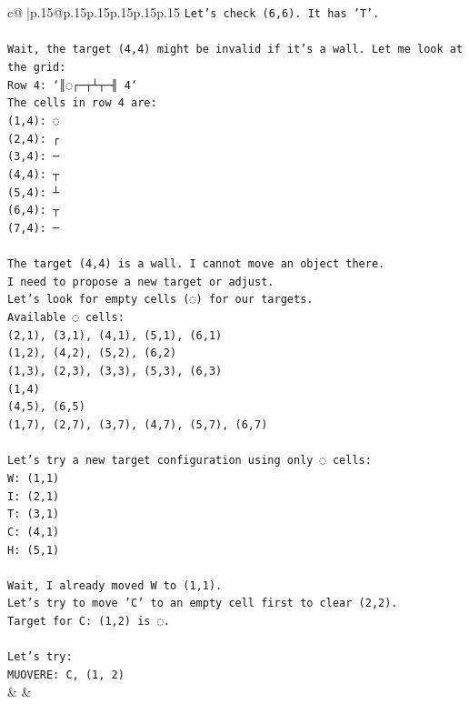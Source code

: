 \documentclass{article}
\begin{document}
{\begin{supertabular}{c@{$\;$}|p{.15\linewidth}@{}p{.15\linewidth}p{.15\linewidth}p{.15\linewidth}p{.15\linewidth}p{.15\linewidth}}
{{{\texttt{Let's check (6,6). It has 'T'.} \\
\\ 
\texttt{Wait, the target (4,4) might be invalid if it's a wall. Let me look at the grid:} \\
\texttt{Row 4: `║◌┌─┬┴┬─╢ 4`} \\
\texttt{The cells in row 4 are:} \\
\texttt{(1,4): ◌} \\
\texttt{(2,4): ┌} \\
\texttt{(3,4): ─} \\
\texttt{(4,4): ┬} \\
\texttt{(5,4): ┴} \\
\texttt{(6,4): ┬} \\
\texttt{(7,4): ─} \\
\\ 
\texttt{The target (4,4) is a wall. I cannot move an object there.} \\
\texttt{I need to propose a new target or adjust.} \\
\texttt{Let's look for empty cells (◌) for our targets.} \\
\texttt{Available ◌ cells:} \\
\texttt{(2,1), (3,1), (4,1), (5,1), (6,1)} \\
\texttt{(1,2), (4,2), (5,2), (6,2)} \\
\texttt{(1,3), (2,3), (3,3), (5,3), (6,3)} \\
\texttt{(1,4)} \\
\texttt{(4,5), (6,5)} \\
\texttt{(1,7), (2,7), (3,7), (4,7), (5,7), (6,7)} \\
\\ 
\texttt{Let's try a new target configuration using only ◌ cells:} \\
\texttt{W: (1,1)} \\
\texttt{I: (2,1)} \\
\texttt{T: (3,1)} \\
\texttt{C: (4,1)} \\
\texttt{H: (5,1)} \\
\\ 
\texttt{Wait, I already moved W to (1,1).} \\
\texttt{Let's try to move 'C' to an empty cell first to clear (2,2).} \\
\texttt{Target for C: (1,2) is ◌.} \\
\\ 
\texttt{Let's try:} \\
\texttt{MUOVERE: C, (1, 2)} \\
            }
        }
    }
    & & \\ \\


\end{supertabular}}
\end{document}
